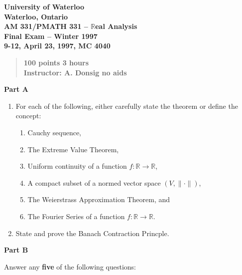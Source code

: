 \documentclass[11pt]{article}
\def\bR{\mathbb{R}}
\begin{document}
\thispagestyle{plain}

\begin{center}
{\large \bf University of Waterloo }\\
{\large \bf Waterloo, Ontario}\\ 
\bf AM 331/PMATH 331 -- $\bR$eal Analysis \\
\large Final Exam -- Winter 1997 \\
9-12, April 23, 1997, MC 4040
\end{center}

\bigskip
\begin{verse} \bf
100 points \hfill 3 hours \\
Instructor: A. Donsig \hfill no aids \\
\end{verse}

\noindent
{\large \bf Part A}
\medskip

\begin{enumerate}

\item For each  of the following, either 
	carefully state the theorem or define the concept:
	\begin{enumerate}
	\item Cauchy sequence,
	\item The Extreme Value Theorem,
	\item Uniform continuity of a function $f : \bR \to \bR $,
	\item A compact subset of a normed vector space $(V,\|\cdot\|)$,
	\item The Weierstrass Approximation Theorem, and
	\item The Fourier Series of a function $f : \bR \to \bR$.
	\end{enumerate}

\item State and prove  the Banach Contraction Princple.

\end{enumerate}

\noindent
{\large \bf Part B}
\medskip

Answer any {\bf five} of the following questions:
\end{document}
